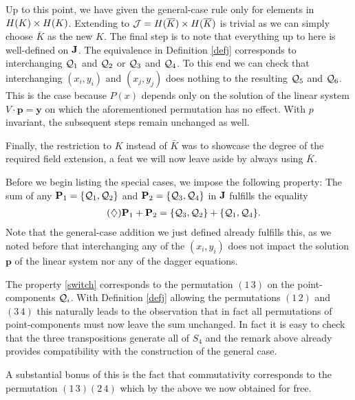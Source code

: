 \documentclass[english,11pt,a4paper]{article}
\begin{document}
\begin{remark}
  Up to this point, we have given the general-case rule only for elements in $H(K) \times H(K)$. Extending to $\mathcal{J} = H(\overline K) \times H(\overline K)$ is trivial as we can simply choose $\bar K$ as the new $K$. The final step is to note that everything up to here is well-defined on $\mathbf{J}$. The equivalence in Definition \ref{defj} corresponds to interchanging $\mathcal{Q}_1$ and $\mathcal{Q}_2$ or $\mathcal{Q}_3$ and $\mathcal{Q}_4$.
  To this end we can check that interchanging $(x_i,y_i)$ and $(x_j,y_j)$ does nothing to the resulting $\mathcal{Q}_5$ and $\mathcal{Q}_6$. This is the case because $P(x)$ depends only on the solution of the linear system $V \cdot \mathbf{p} = \mathbf{y}$ on which the aforementioned permutation has no effect. With $p$ invariant, the subsequent steps remain unchanged as well.

  Finally, the restriction to $K$ instead of $\bar K$ was to showcase the degree of the required field extension, a feat we will now leave aside by always using $\bar K$.
\end{remark}

Before we begin listing the special cases, we impose the following property: The sum of any $\mathbf{P}_1 = \{\mathcal{Q}_1,\mathcal{Q}_2\}$ and $\mathbf{P}_2 = \{\mathcal{Q}_3,\mathcal{Q}_4\}$ in $\mathbf{J}$ fulfills the equality
\begin{align*}
  \tag{$\diamondsuit$} \label{switch} \mathbf{P}_1 + \mathbf{P}_2 &= \{\mathcal{Q}_3,\mathcal{Q}_2\} + \{\mathcal{Q}_1,\mathcal{Q}_4\}.
\end{align*}
Note that the general-case addition we just defined already fulfills this, as we noted before that interchanging any of the $(x_i, y_i)$ does not impact the solution $\mathbf{p}$ of the linear system nor any of the dagger equations.

\begin{remark}\label{permut}
  The property \eqref{switch} corresponds to the permutation $(1 \, 3)$ on the point-components $\mathcal{Q}_i$. With Definition \ref{defj} allowing the permutations $(1 \, 2)$ and $(3 \, 4)$ this naturally leads to the observation that in fact all permutations of point-components must now leave the sum unchanged. In fact it is easy to check that the three transpositions generate all of $S_4$ and the remark above already provides compatibility with the construction of the general case.

  A substantial bonus of this is the fact that commutativity corresponds to the permutation $(1 \, 3)(2 \, 4)$ which by the above we now obtained for free.
\end{remark}

\end{document}
